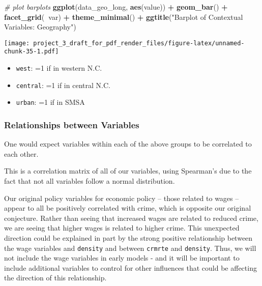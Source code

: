 \documentclass[]{article}
\newenvironment{Shaded}{\begin{snugshade}}{\end{snugshade}}
\newcommand{\CommentTok}[1]{\textcolor[rgb]{0.56,0.35,0.01}{\textit{#1}}}
\newcommand{\KeywordTok}[1]{\textcolor[rgb]{0.13,0.29,0.53}{\textbf{#1}}}
\newcommand{\NormalTok}[1]{#1}
\newcommand{\OperatorTok}[1]{\textcolor[rgb]{0.81,0.36,0.00}{\textbf{#1}}}
\newcommand{\StringTok}[1]{\textcolor[rgb]{0.31,0.60,0.02}{#1}}
\providecommand{\tightlist}{%
  \setlength{\itemsep}{0pt}\setlength{\parskip}{0pt}}
\begin{document}
\begin{Shaded}
\begin{Highlighting}[]
\CommentTok{# plot barplots}
\KeywordTok{ggplot}\NormalTok{(data_geo_long, }\KeywordTok{aes}\NormalTok{(value)) }\OperatorTok{+}
\StringTok{  }\KeywordTok{geom_bar}\NormalTok{() }\OperatorTok{+}
\StringTok{  }\KeywordTok{facet_grid}\NormalTok{(}\OperatorTok{~}\NormalTok{var) }\OperatorTok{+}
\StringTok{  }\KeywordTok{theme_minimal}\NormalTok{() }\OperatorTok{+}
\StringTok{  }\KeywordTok{ggtitle}\NormalTok{(}\StringTok{"Barplot of Contextual Variables: Geography"}\NormalTok{)}
\end{Highlighting}
\end{Shaded}

\texttt{[image: project\_3\_draft\_for\_pdf\_render\_files/figure-latex/unnamed-chunk-35-1.pdf]}

\begin{itemize}
\tightlist
\item
  \texttt{west}: =1 if in western N.C.
\item
  \texttt{central}: =1 if in central N.C.
\item
  \texttt{urban}: =1 if in SMSA
\end{itemize}

\hypertarget{relationships-between-variables}{%
\subsubsection{Relationships between
Variables}\label{relationships-between-variables}}

One would expect variables within each of the above groups to be
correlated to each other.

This is a correlation matrix of all of our variables, using Spearman's
due to the fact that not all variables follow a normal distribution.

Our original policy variables for economic policy -- those related to
wages -- appear to all be positively correlated with crime, which is
opposite our original conjecture. Rather than seeing that increased
wages are related to reduced crime, we are seeing that higher wages is
related to higher crime. This unexpected direction could be explained in
part by the strong positive relationship between the wage variables and
\texttt{density} and between \texttt{crmrte} and \texttt{density}. Thus,
we will not include the wage variables in early models - and it will be
important to include additional variables to control for other
influences that could be affecting the direction of this relationship.
\end{document}

